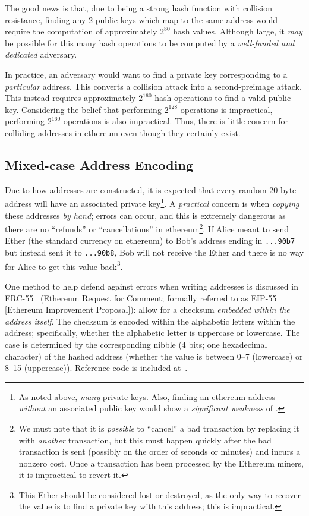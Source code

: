 The good news is that, due to \Keccak{} being a strong \gls{hash function}
with collision resistance,
finding any 2 public keys which map to the same address would require
the computation of approximately $2^{80}$ hash values.
Although large, it \emph{may} be possible for this many hash operations
to be computed by a \emph{well-funded and dedicated} adversary.

In practice, an adversary would want to find a private key
corresponding to a \emph{particular} address.
This converts a collision attack into a second-preimage attack.
This instead requires approximately $2^{160}$ hash operations
to find a valid public key.
Considering the belief that performing $2^{128}$ operations is impractical,
performing $2^{160}$ operations is also impractical.
Thus, there is little concern for colliding addresses in \gls{ethereum}
even though they certainly exist.

\subsection{Mixed-case Address Encoding}

Due to how addresses are constructed,
it is expected that every random 20-byte address will have an associated
private key\footnote{As noted above, \emph{many} private keys.
Also, finding an \gls{ethereum} address \emph{without} an associated public key
would show a \emph{significant weakness} of \Keccak{}.}.
A \emph{practical} concern is when \emph{copying}
these addresses \emph{by hand};
errors can occur, and this is extremely dangerous as there are no ``refunds'' or
``cancellations'' in
\gls{ethereum}\footnote{We must note that it is \emph{possible} to ``cancel''
a bad transaction by replacing it with \emph{another} transaction,
but this must happen quickly after the bad transaction is sent
(possibly on the order of seconds or minutes)
and incurs a nonzero cost.
Once a transaction has been processed by the Ethereum miners,
it is impractical to revert it.}.
If Alice meant to send Ether (the standard currency on \gls{ethereum})
to Bob's address ending in
\texttt{...90b7} but instead sent it to \texttt{...90b8},
Bob will not receive the Ether and there is no way for Alice to get this value
back\footnote{This Ether should be considered
lost or destroyed, as the only way to recover the value is to find
a private key with this address;
this is impractical.}.

One method to help defend against errors when writing addresses
is discussed in ERC-55~\cite{ERC-55}
(Ethereum Request for Comment;
formally referred to as EIP-55 [Ethereum Improvement Proposal]):
allow for a checksum \emph{embedded within the address itself}.
The checksum is encoded within the alphabetic letters within the address;
specifically, whether the alphabetic letter is uppercase or lowercase.
The case is determined by the corresponding nibble
(4 bits; one hexadecimal character)
of the hashed address (whether the value is between 0--7 (lowercase)
or 8--15 (uppercase)).
Reference code is included at~\cite{ERC-55}.

